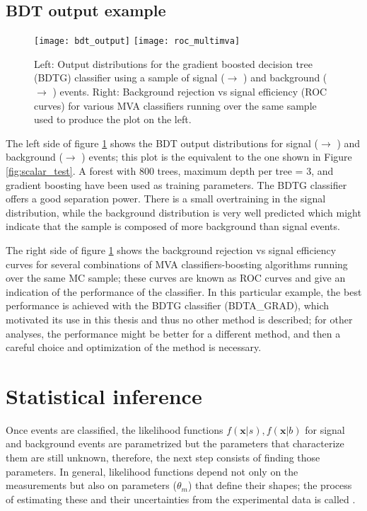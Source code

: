 \subsection{BDT output example}

\begin{figure}[!h]
  \centering
  \texttt{[image: bdt\_output]}
  \texttt{[image: roc\_multimva]}
  \caption[BDT output example.]{Left: Output distributions for the gradient boosted decision tree (BDTG) classifier using a sample of signal (\pp $\to$ \tHq) and background (\pp $\to$ \ttbar) events. Right: Background rejection vs signal efficiency (ROC curves) for various MVA classifiers running over the same sample used to produce the plot on the left.}\label{fig:bdt_output}
\end{figure}

The left side of figure \ref{fig:bdt_output} shows the BDT output distributions for signal (\pp $\to$ \tHq) and background (\pp $\to$ \ttbar) events; this plot is the equivalent to the one shown in Figure \ref{fig:scalar_test}. A forest with 800 trees, maximum depth per tree = 3, and gradient boosting have been used as training parameters. The BDTG classifier offers a good separation power. There is a small overtraining in the signal distribution, while the background distribution is very well predicted which might indicate that the sample is composed of more background than signal events.

The right side of figure \ref{fig:bdt_output} shows the background rejection vs signal efficiency curves for several combinations of MVA classifiers-boosting algorithms running over the same MC sample; these curves are known as ROC curves and give an indication of the performance of the classifier. In this particular example, the best performance is achieved with the BDTG classifier (BDTA\_GRAD), which motivated its use in this thesis and thus no other method is described; for other analyses, the performance might be better for a different method, and then a careful choice and optimization of the method is necessary.           

\section{Statistical inference}

Once events are classified, the likelihood functions $f(\textbf{x}|s), f(\textbf{x}|b)$ for signal and background events are parametrized but the parameters that characterize them are still unknown, therefore, the next step consists of finding those parameters. In general, likelihood functions depend not only on the measurements but also on parameters ($\theta_m$) that define their shapes; the process of estimating these  and their uncertainties from the experimental data is called .     

